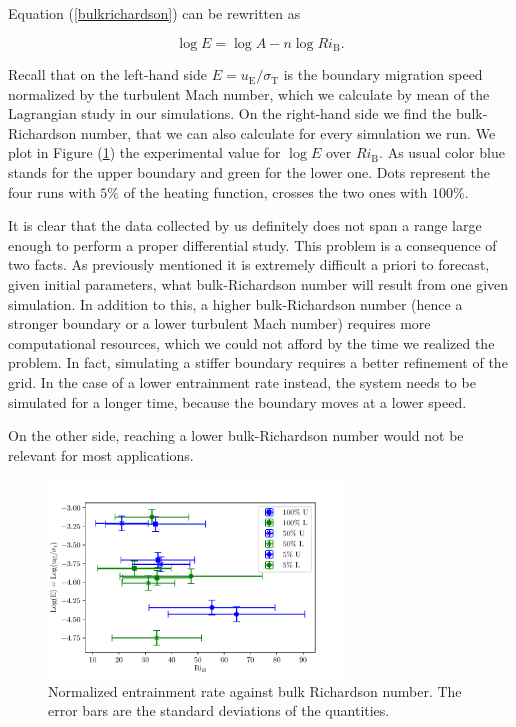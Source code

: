 Equation (\ref{bulkrichardson}) can be rewritten as

\begin{equation}\label{eq:logaritmicbulk}
	\log{E} = \log{A} - n \log{Ri_{\mathrm{B}}}.
\end{equation}

Recall that on the left-hand side $E=u_{\mathrm{E}}/\sigma_{\mathrm{T}}$ is the boundary migration speed normalized by the turbulent Mach number, which we calculate by mean of the Lagrangian study in our simulations. On the right-hand side we find the bulk-Richardson number, that we can also calculate for every simulation we run. We plot in Figure (\ref{fig:differential}) the experimental value for $\log E$ over $Ri_{\mathrm{B}}$. As usual color blue stands for the upper boundary and green for the lower one. Dots represent the four runs with $5 \%$ of the heating function, crosses the two ones with $100 \%$.

It is clear that the data collected by us definitely does not span a range large enough to perform a proper differential study. This problem is a consequence of two facts. As previously mentioned it is extremely difficult a priori to forecast, given initial parameters, what bulk-Richardson number will result from one given simulation. In addition to this, a higher bulk-Richardson number (hence a stronger boundary or a lower turbulent Mach number) requires more computational resources, which we could not afford by the time we realized the problem. In fact, simulating a stiffer boundary requires a better refinement of the grid. In the case of a lower entrainment rate instead, the system needs to be simulated for a longer time, because the boundary moves at a lower speed.

On the other side, reaching a lower bulk-Richardson number would not be relevant for most applications.

\begin{figure}[t!]
\centering
\includegraphics[width=0.7\textwidth]{./img/differential2d.pdf}
\caption{Normalized entrainment rate against bulk Richardson number. The error bars are the standard deviations of the quantities.}
\label{fig:differential}
\centering
\end{figure}

